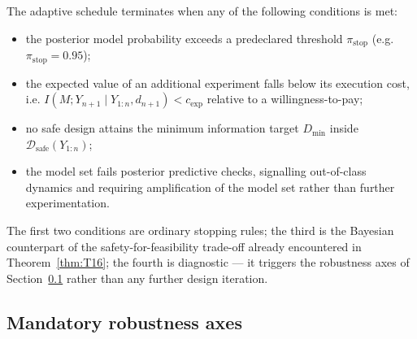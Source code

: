 The adaptive schedule terminates when any of the following conditions is met:
\begin{itemize}
\item the posterior model probability exceeds a predeclared threshold $\pi_{\mathrm{stop}}$ (e.g. $\pi_{\mathrm{stop}} = 0.95$);
\item the expected value of an additional experiment falls below its execution cost, i.e. $I(M; Y_{n+1} \mid Y_{1:n}, d_{n+1}) < c_{\mathrm{exp}}$ relative to a willingness-to-pay;
\item no safe design attains the minimum information target $D_{\min}$ inside $\mathcal{D}_{\mathrm{safe}}(Y_{1:n})$;
\item the model set fails posterior predictive checks, signalling out-of-class dynamics and requiring amplification of the model set rather than further experimentation.
\end{itemize}
The first two conditions are ordinary stopping rules; the third is the Bayesian counterpart of the safety-for-feasibility trade-off already encountered in Theorem~\ref{thm:T16}; the fourth is diagnostic --- it triggers the robustness axes of Section~\ref{subsec:bayes:robust} rather than any further design iteration.

\subsection{Mandatory robustness axes}
\label{subsec:bayes:robust}

